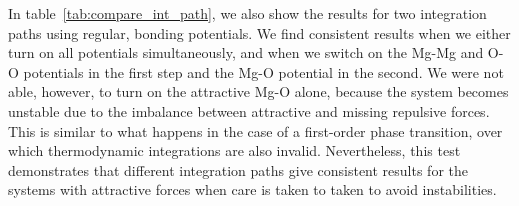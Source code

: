In table~\ref{tab:compare_int_path}, we also show the results for two
integration paths using regular, bonding potentials. We find consistent
results when we either turn on all potentials simultaneously, and when we
switch on the Mg-Mg and O-O potentials in the first step and the Mg-O
potential in the second. We were not able, however, to turn on the
attractive Mg-O alone, because the system becomes unstable due to the
imbalance between attractive and missing repulsive forces. This is similar
to what happens in the case of a first-order phase transition, over
which thermodynamic integrations are also invalid. Nevertheless, this test
demonstrates that different integration paths give consistent results 
for the systems with attractive forces when care is taken to taken to avoid
instabilities.
